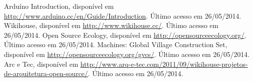 \documentclass[final,12pt, times, 5p, twocolumn]{elsarticle}
\begin{document}





 \begin{thebibliography}{00}

	Arduíno Introduction, disponível em \url{http://www.arduino.cc/en/Guide/Introduction}. Último acesso em 26/05/2014.
	Wikihouse, disponível em \url{http://www.wikihouse.cc/}. Último acesso em 26/05/2014.
   Open Source Ecology, disponível em \url{http://opensourceecology.org/}. Último acesso em 26/05/2014.
   Machines: Global Village Construction Set, disponível em \url{http://opensourceecology.org/gvcs/}. Último acesso em 26/05/2014.
   Arc e Tec, disponível em \url{http://www.arq-e-tec.com/2011/09/wikihouse-projetos-de-arquitetura-open-source/}. Último acesso em 26/05/2014.


 \end{thebibliography}
\end{document}
